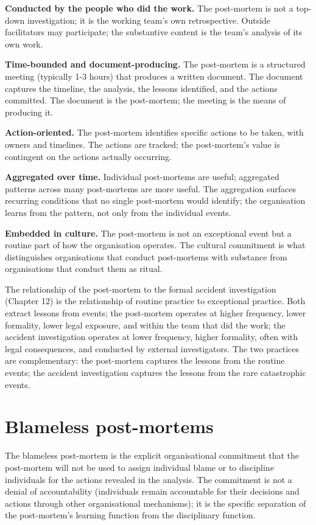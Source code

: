 \textbf{Conducted by the people who did the work.} The post-mortem is not a top-down investigation; it is the working team's own retrospective. Outside facilitators may participate; the substantive content is the team's analysis of its own work.

\textbf{Time-bounded and document-producing.} The post-mortem is a structured meeting (typically 1-3 hours) that produces a written document. The document captures the timeline, the analysis, the lessons identified, and the actions committed. The document is the post-mortem; the meeting is the means of producing it.

\textbf{Action-oriented.} The post-mortem identifies specific actions to be taken, with owners and timelines. The actions are tracked; the post-mortem's value is contingent on the actions actually occurring.

\textbf{Aggregated over time.} Individual post-mortems are useful; aggregated patterns across many post-mortems are more useful. The aggregation surfaces recurring conditions that no single post-mortem would identify; the organisation learns from the pattern, not only from the individual events.

\textbf{Embedded in culture.} The post-mortem is not an exceptional event but a routine part of how the organisation operates. The cultural commitment is what distinguishes organisations that conduct post-mortems with substance from organisations that conduct them as ritual.

The relationship of the post-mortem to the formal accident investigation (Chapter 12) is the relationship of routine practice to exceptional practice. Both extract lessons from events; the post-mortem operates at higher frequency, lower formality, lower legal exposure, and within the team that did the work; the accident investigation operates at lower frequency, higher formality, often with legal consequences, and conducted by external investigators. The two practices are complementary: the post-mortem captures the lessons from the routine events; the accident investigation captures the lessons from the rare catastrophic events.

\section{Blameless post-mortems}

The blameless post-mortem is the explicit organisational commitment that the post-mortem will not be used to assign individual blame or to discipline individuals for the actions revealed in the analysis. The commitment is not a denial of accountability (individuals remain accountable for their decisions and actions through other organisational mechanisms); it is the specific separation of the post-mortem's learning function from the disciplinary function.

